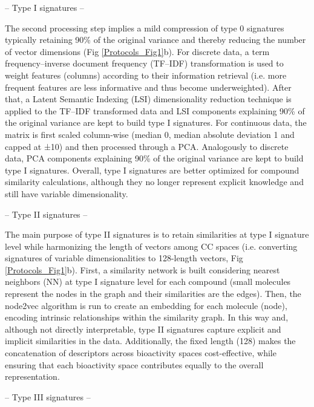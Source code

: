 -- Type I signatures --

The second processing step implies a mild compression of type 0 signatures typically retaining 90\% of the original variance and thereby reducing the number of vector dimensions (Fig \ref{Protocols_Fig1}b). For discrete data, a term frequency–inverse document frequency (TF–IDF) transformation is used to weight features (columns) according to their information retrieval (i.e. more frequent features are less informative and thus become underweighted). After that, a Latent Semantic Indexing (LSI) dimensionality reduction technique is applied to the TF–IDF transformed data and LSI components explaining 90\% of the original variance are kept to build type I signatures. For continuous data, the matrix is first scaled column-wise (median 0, median absolute deviation 1 and capped at ±10) and then processed through a PCA. Analogously to discrete data, PCA components explaining 90\% of the original variance are kept to build type I signatures. Overall, type I signatures are better optimized for compound similarity calculations, although they no longer represent explicit knowledge and still have variable dimensionality.  

-- Type II signatures --

The main purpose of type II signatures is to retain similarities at type I signature level while harmonizing the length of vectors among CC spaces (i.e. converting signatures of variable dimensionalities to 128-length vectors, Fig \ref{Protocols_Fig1}b). First, a similarity network is built considering nearest neighbors (NN) at type I signature level for each compound (small molecules represent the nodes in the graph and their similarities are the edges). Then, the node2vec algorithm is run to create an embedding for each molecule (node), encoding intrinsic relationships within the similarity graph. In this way and, although not directly interpretable, type II signatures capture explicit and implicit similarities in the data. Additionally, the fixed length (128) makes the concatenation of descriptors across bioactivity spaces cost-effective, while ensuring that each bioactivity space contributes equally to the overall representation.  


-- Type III signatures --

